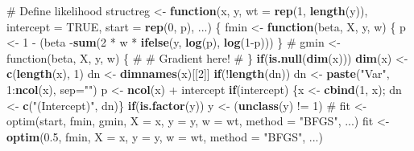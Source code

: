\documentclass[]{article}
\theoremstyle{plain} %
\newenvironment{Shaded}{\begin{snugshade}}{\end{snugshade}}
\newcommand{\KeywordTok}[1]{\textcolor[rgb]{0.12,0.11,0.11}{\textbf{#1}}}
\newcommand{\DataTypeTok}[1]{\textcolor[rgb]{0.00,0.34,0.68}{#1}}
\newcommand{\DecValTok}[1]{\textcolor[rgb]{0.69,0.50,0.00}{#1}}
\newcommand{\FloatTok}[1]{\textcolor[rgb]{0.69,0.50,0.00}{#1}}
\newcommand{\StringTok}[1]{\textcolor[rgb]{0.75,0.01,0.01}{#1}}
\newcommand{\CommentTok}[1]{\textcolor[rgb]{0.54,0.53,0.53}{#1}}
\newcommand{\OtherTok}[1]{\textcolor[rgb]{0.00,0.43,0.16}{#1}}
\newcommand{\ControlFlowTok}[1]{\textcolor[rgb]{0.12,0.11,0.11}{\textbf{#1}}}
\newcommand{\OperatorTok}[1]{\textcolor[rgb]{0.12,0.11,0.11}{#1}}
\newcommand{\NormalTok}[1]{\textcolor[rgb]{0.12,0.11,0.11}{#1}}
\begin{document}
\begin{Shaded}
\begin{Highlighting}[]
\CommentTok{# Define likelihood}
\NormalTok{structreg <-}\StringTok{ }\ControlFlowTok{function}\NormalTok{(x, y, }\DataTypeTok{wt =} \KeywordTok{rep}\NormalTok{(}\DecValTok{1}\NormalTok{, }\KeywordTok{length}\NormalTok{(y)), }\DataTypeTok{intercept =} \OtherTok{TRUE}\NormalTok{, }\DataTypeTok{start =} \KeywordTok{rep}\NormalTok{(}\DecValTok{0}\NormalTok{, p), ...) \{}
\NormalTok{    fmin <-}\StringTok{ }\ControlFlowTok{function}\NormalTok{(beta, X, y, w) \{}
\NormalTok{        p <-}\StringTok{ }\DecValTok{1} \OperatorTok{-}\StringTok{ }\NormalTok{(beta }\OperatorTok{%
        \OperatorTok{-}\KeywordTok{sum}\NormalTok{(}\DecValTok{2} \OperatorTok{*}\StringTok{ }\NormalTok{w }\OperatorTok{*}\StringTok{ }\KeywordTok{ifelse}\NormalTok{(y, }\KeywordTok{log}\NormalTok{(p), }\KeywordTok{log}\NormalTok{(}\DecValTok{1}\OperatorTok{-}\NormalTok{p))) }
\NormalTok{    \}}
\CommentTok{#   gmin <- function(beta, X, y, w) \{}
\CommentTok{#       # Gradient here!}
\CommentTok{#   \}}
    \ControlFlowTok{if}\NormalTok{(}\KeywordTok{is.null}\NormalTok{(}\KeywordTok{dim}\NormalTok{(x))) }\KeywordTok{dim}\NormalTok{(x) <-}\StringTok{ }\KeywordTok{c}\NormalTok{(}\KeywordTok{length}\NormalTok{(x), }\DecValTok{1}\NormalTok{)}
\NormalTok{    dn <-}\StringTok{ }\KeywordTok{dimnames}\NormalTok{(x)[[}\DecValTok{2}\NormalTok{]]}
    \ControlFlowTok{if}\NormalTok{(}\OperatorTok{!}\KeywordTok{length}\NormalTok{(dn)) dn <-}\StringTok{ }\KeywordTok{paste}\NormalTok{(}\StringTok{"Var"}\NormalTok{, }\DecValTok{1}\OperatorTok{:}\KeywordTok{ncol}\NormalTok{(x), }\DataTypeTok{sep=}\StringTok{""}\NormalTok{)}
\NormalTok{    p <-}\StringTok{ }\KeywordTok{ncol}\NormalTok{(x) }\OperatorTok{+}\StringTok{ }\NormalTok{intercept}
    \ControlFlowTok{if}\NormalTok{(intercept) \{x <-}\StringTok{ }\KeywordTok{cbind}\NormalTok{(}\DecValTok{1}\NormalTok{, x); dn <-}\StringTok{ }\KeywordTok{c}\NormalTok{(}\StringTok{"(Intercept)"}\NormalTok{, dn)\} }
    \ControlFlowTok{if}\NormalTok{(}\KeywordTok{is.factor}\NormalTok{(y)) y <-}\StringTok{ }\NormalTok{(}\KeywordTok{unclass}\NormalTok{(y) }\OperatorTok{!=}\StringTok{ }\DecValTok{1}\NormalTok{)}
\CommentTok{#   fit <- optim(start, fmin, gmin, X = x, y = y, w = wt, method = "BFGS", ...)}
\NormalTok{    fit <-}\StringTok{ }\KeywordTok{optim}\NormalTok{(}\FloatTok{0.5}\NormalTok{, fmin, }\DataTypeTok{X =}\NormalTok{ x, }\DataTypeTok{y =}\NormalTok{ y, }\DataTypeTok{w =}\NormalTok{ wt, }\DataTypeTok{method =} \StringTok{"BFGS"}\NormalTok{, ...)}
}
\end{Highlighting}
\end{Shaded}
\end{document}

